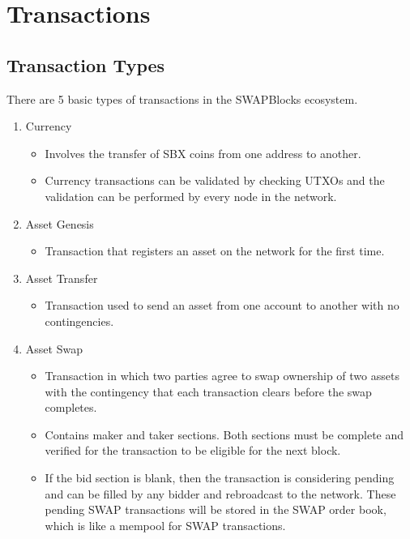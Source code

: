 \documentclass[12pt]{article}
\begin{document}


\section{Transactions}

\subsection{Transaction Types}
There are 5 basic types of transactions in the SWAPBlocks ecosystem.

\begin{enumerate}
	\item Currency
		\begin{itemize}
			\item{Involves the transfer of SBX coins from one address to another.}
			\item{Currency transactions can be validated by checking UTXOs and the
				validation can be performed by every node in the network.}
		\end{itemize}
	\item Asset Genesis
		\begin{itemize}
			\item{Transaction that registers an asset on the network for the first time.}
		\end{itemize}
	\item Asset Transfer
		\begin{itemize}
			\item{Transaction used to send an asset from one account to another
				with no contingencies.}
		\end{itemize}
	\item Asset Swap
		\begin{itemize}
			\item{Transaction in which two parties agree to swap 
				ownership of two assets with the contingency that 
				each transaction clears before the swap completes.}
			\item{Contains maker and taker sections. Both sections must
				be complete and verified for the transaction to be eligible for
				the next block.}
			\item{If the bid section is blank, then the transaction is considering pending and can
				be filled by any bidder and rebroadcast to the network. These pending SWAP transactions
				will be stored in the SWAP order book, which is like a mempool for SWAP transactions.} 
		\end{itemize}

\end{enumerate}
\end{document}
